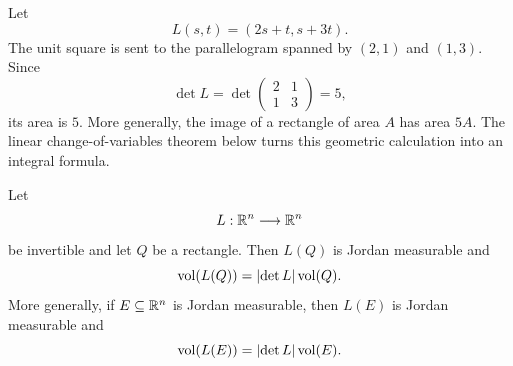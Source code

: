 \begin{example}
Let
\[
L(s,t)=(2s+t,s+3t).
\]
The unit square is sent to the parallelogram spanned by $(2,1)$ and $(1,3)$.
Since
\[
\det L=\det\begin{pmatrix}2&1\\1&3\end{pmatrix}=5,
\]
its area is $5$.  More generally, the image of a rectangle of area $A$ has
area $5A$.  The linear change-of-variables theorem below turns this geometric
calculation into an integral formula.
\end{example}

\begin{lemma}
\label{lem:linear-volume}
Let
\[
L:\mathbb{R}^n\longrightarrow\mathbb{R}^n
\]
be invertible and let $Q$ be a rectangle.  Then $L(Q)$ is Jordan measurable
and
\[
\operatorname{vol}(L(Q))
=\lvert \det L\rvert\operatorname{vol}(Q).
\]
More generally, if \(E\subseteq\mathbb{R}^n\) is Jordan measurable, then \(L(E)\)
is Jordan measurable and
\[
\operatorname{vol}(L(E))
=\lvert \det L\rvert\operatorname{vol}(E).
\]
\end{lemma}
